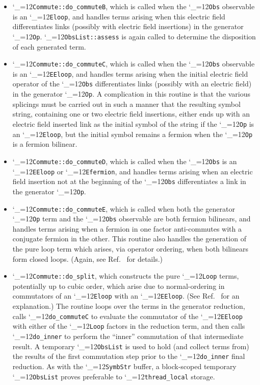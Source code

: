 \documentclass [12pt]{article}
\makeatletter
\renewcommand{\tt}{\begingroup\catcode`_=12\def\_{\string_}\tt@}
\newcommand{\tt@}[1]{\texttt{#1}\endgroup}
\makeatother
\begin{document}
\begin{itemize}
\item
    \tt{Commute::do_commuteB}, which is called when the
    \tt{Obs} observable is an \tt{Eloop}, and handles
    terms arising when this electric field differentiates
    links (possibly with electric field insertions) in the generator \tt{Op}.
    \tt{ObsList::assess} is again called to determine
    the disposition of each generated term.

\item
    \tt{Commute::do_commuteC}, which is called when the
    \tt{Obs} observable is an \tt{EEloop}, and handles
    terms arising when the initial electric field operator of
    the \tt{Obs} differentiates links (possibly with an electric field)
    in the generator \tt{Op}.
    A complication in this routine is that the various splicings
    must be carried out in such a manner that the resulting symbol
    string, containing one or two electric field insertions,
    either ends up with an electric field inserted link as the
    initial symbol of the string if the \tt{Op} is an \tt{Eloop},
    but the initial symbol remains a fermion when the \tt{Op} is
    a fermion bilinear.

\item
    \tt{Commute::do_commuteD}, which is called when the \tt{Obs} is
    an \tt{EEloop} or \tt{Efermion},
    and handles terms arising when an electric field insertion
    not at the beginning of the \tt{Obs} differentiates
    a link in the generator \tt{Op}.

\item
    \tt{Commute::do_commuteE}, which is called when both the generator \tt{Op}
    term and the \tt{Obs} observable are both fermion bilinears, and handles
    terms arising when a fermion in one factor anti-commutes with a
    conjugate fermion in the other.
    This routine also handles the generation of the pure loop
    term which arises, via operator ordering, when both
    bilinears form closed loops.
    (Again, see Ref.~\cite{CSVAII} for details.)

\item
    \tt{Commute::do_split}, which constructs the 
    pure \tt{Loop} terms, potentially up to cubic order,
    which arise due to normal-ordering
    in commutators of an \tt{Eloop} with an \tt{EEloop}.
    (See Ref.~\cite{CSVAII} for an explanation.)
    The routine loops over the terms in the generator reduction,
    calls \tt{do_commuteC} to evaluate the
    commutator of the \tt{EEloop} with either of the \tt{Loop} factors
    in the reduction term,
    and then calls \tt{do_inner} to perform the ``inner'' commutation
    of that intermediate result.
    A temporary \tt{ObsList} is used
    to hold (and collect terms from) the results of the first
    commutation step prior to the \tt{do_inner} final reduction.
    As with the \tt{SymbStr} buffer, a block-scoped temporary
    \tt{ObsList} proves preferable to \tt{thread_local} storage.


\end{itemize}
\end{document}
